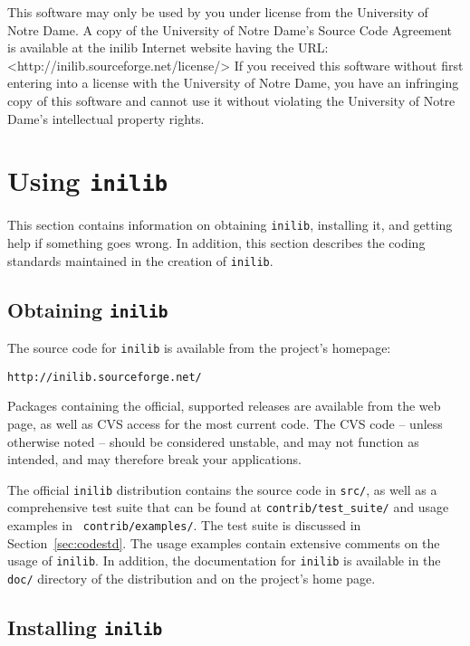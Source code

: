 %
This software may only be used by you under license from the
University of Notre Dame.  A copy of the University of Notre Dame's
Source Code Agreement is available at the inilib Internet website
having the URL: <http://inilib.sourceforge.net/license/> If you
received this software without first entering into a license with the
University of Notre Dame, you have an infringing copy of this software
and cannot use it without violating the University of Notre Dame's
intellectual property rights.
% 
%

\section[Using inilib]{Using {\tt inilib}}

This section contains information on obtaining {\tt inilib},
installing it, and getting help if something goes wrong.  In addition,
this section describes the coding standards maintained in the creation
of {\tt inilib}.

\subsection[Obtaining inilib]{Obtaining {\tt inilib}}
The source code for {\tt inilib} is available from the project's
homepage:

\begin{center}
{\tt http://inilib.sourceforge.net/}
\end{center}

Packages containing the official, supported releases are available
from the web page, as well as CVS access for the most current code.
The CVS code -- unless otherwise noted -- should be considered
unstable, and may not function as intended, and may therefore break
your applications.

The official {\tt inilib} distribution contains the source code in
{\tt src/}, as well as a comprehensive test suite that can be found at
{\tt contrib/test\_suite/} and usage examples in {\tt
contrib/examples/}.  The test suite is discussed in
Section~\ref{sec:codestd}.  The usage examples contain extensive
comments on the usage of {\tt inilib}.  In addition, the documentation
for {\tt inilib} is available in the {\tt doc/} directory of the
distribution and on the project's home page.

\subsection[Installing inilib]{Installing {\tt inilib}}

